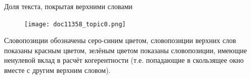 \begin{frame}{Доля текста, покрытая верхними словами}

\begin{figure}
        \texttt{[image: doc11358\_topic0.png]} %
\end{figure}
\vspace{-7pt}
Словопозиции обозначены серо-синим цветом, словопозиции верхних слов показаны красным цветом, зелёным цветом показаны словопозиции, имеющие ненулевой вклад в расчёт когерентности (т.е. попадающие в скользящее окно вместе с другим верхним словом).
\end{frame}






